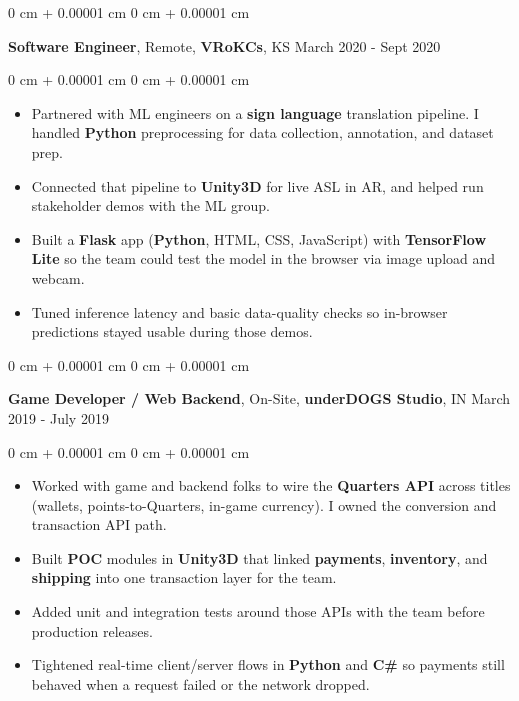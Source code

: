 \documentclass[10pt, letterpaper]{article}
\newenvironment{highlights}{
    \begin{itemize}[
        topsep=0.10 cm,
        parsep=0.10 cm,
        partopsep=0pt,
        itemsep=0pt,
        leftmargin=0 cm + 10pt
    ]
}{
    \end{itemize}
} %
\newenvironment{onecolentry}{
    \begin{adjustwidth}{
        0 cm + 0.00001 cm
    }{
        0 cm + 0.00001 cm
    }
}{
    \end{adjustwidth}
} %
\newcommand{\resumeheading}[2]{%
    \begin{onecolentry}
        #1 \hfill #2
    \end{onecolentry}
} %
\begin{document}
\vspace{0.15 cm}
\resumeheading{\textbf{Software Engineer}, Remote, \textbf{VRoKCs}, KS}{March 2020 - Sept 2020}
\begin{onecolentry}
\begin{highlights}
	\item Partnered with ML engineers on a \textbf{sign language} translation pipeline. I handled \textbf{Python} preprocessing for data collection, annotation, and dataset prep.
	\item Connected that pipeline to \textbf{Unity3D} for live ASL in AR, and helped run stakeholder demos with the ML group.
	\item Built a \textbf{Flask} app (\textbf{Python}, HTML, CSS, JavaScript) with \textbf{TensorFlow Lite} so the team could test the model in the browser via image upload and webcam.
	\item Tuned inference latency and basic data-quality checks so in-browser predictions stayed usable during those demos.
\end{highlights}
\end{onecolentry}





\vspace{0.15 cm}
\resumeheading{\textbf{Game Developer / Web Backend}, On-Site, \textbf{underDOGS Studio}, IN}{March 2019 - July 2019}

\begin{onecolentry}
\begin{highlights}
	\item Worked with game and backend folks to wire the \textbf{Quarters API} across titles (wallets, points-to-Quarters, in-game currency). I owned the conversion and transaction API path.
	\item Built \textbf{POC} modules in \textbf{Unity3D} that linked \textbf{payments}, \textbf{inventory}, and \textbf{shipping} into one transaction layer for the team.
	\item Added unit and integration tests around those APIs with the team before production releases.
	\item Tightened real-time client/server flows in \textbf{Python} and \textbf{C\#} so payments still behaved when a request failed or the network dropped.
\end{highlights}
\end{onecolentry}




\vspace{0.2 cm}
\end{document}
